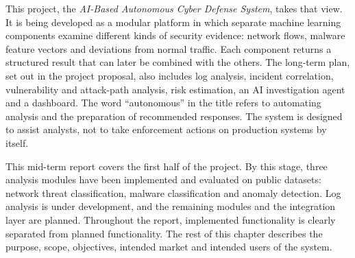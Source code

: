 This project, the \textit{AI-Based Autonomous Cyber Defense System}, takes that view. It is being developed as a modular platform in which separate machine learning components examine different kinds of security evidence: network flows, malware feature vectors and deviations from normal traffic. Each component returns a structured result that can later be combined with the others. The long-term plan, set out in the project proposal, also includes log analysis, incident correlation, vulnerability and attack-path analysis, risk estimation, an AI investigation agent and a dashboard. The word ``autonomous'' in the title refers to automating analysis and the preparation of recommended responses. The system is designed to assist analysts, not to take enforcement actions on production systems by itself.

This mid-term report covers the first half of the project. By this stage, three analysis modules have been implemented and evaluated on public datasets: network threat classification, malware classification and anomaly detection. Log analysis is under development, and the remaining modules and the integration layer are planned. Throughout the report, implemented functionality is clearly separated from planned functionality. The rest of this chapter describes the purpose, scope, objectives, intended market and intended users of the system.
